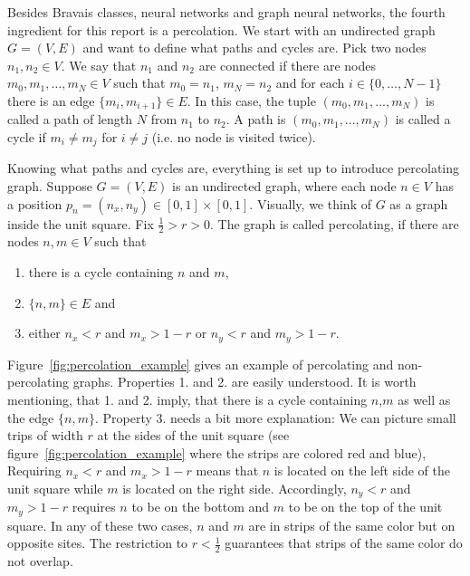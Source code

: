 Besides Bravais classes, neural networks and graph neural networks, the fourth ingredient for this report is a percolation.
We start with an undirected graph $G=(V,E)$ and want to define what paths and cycles are. Pick two nodes $n_1, n_2\in V$. We say that $n_1$ and $n_2$ are connected if
there are nodes $m_0,m_1,\dots,m_N\in V$ such that $m_0=n_1$, $m_N=n_2$ and for each $i\in\{0,\dots,N-1\}$ there is an edge $\{m_i,m_{i+1}\}\in E$.
In this case, the tuple $(m_0,m_1,...,m_N)$ is called a path of length $N$ from $n_1$ to $n_2$. A path is $(m_0,m_1,...,m_N)$ is called a cycle if $m_i\neq m_j$ for $i\neq j$ (i.e. no node is visited twice).

Knowing what paths and cycles are, everything is set up to introduce percolating graph. Suppose $G=(V,E)$ is an undirected graph, 
where each node $n\in V$ has a position $p_n=(n_x,n_y)\in[0,1]\times[0,1]$. Visually, we think of $G$ as a graph inside the unit square.
Fix $\frac{1}{2}>r>0$. The graph is called percolating, if there are nodes $n,m\in V$ such that
\begin{enumerate}
    \item there is a cycle containing $n$ and $m$,
    \item $\{n,m\}\in E$ and
    \item either $n_x<r$ and $m_x>1-r$ or $n_y<r$ and $m_y>1-r$.
\end{enumerate}
Figure~\ref{fig:percolation_example} gives an example of percolating and non-percolating graphs. 
Properties 1. and 2. are easily understood. It is worth mentioning, that 1. and 2. imply, that there is a cycle containing $n$,$m$ as well as the edge $\{n,m\}$.
Property 3. needs a bit more explanation: We can picture small trips of width $r$ at the sides of the unit square 
(see figure~\ref{fig:percolation_example} where the strips are colored red and blue), Requiring $n_x<r$ and $m_x>1-r$ means that $n$ is located on the left side of the unit square while
$m$ is located on the right side. 
Accordingly, $n_y<r$ and $m_y>1-r$ requires $n$ to be on the bottom and $m$ to be on the top of the unit square.
In any of these two cases, $n$ and $m$ are in strips of the same color but on opposite sites.
The restriction to $r<\frac{1}{2}$ guarantees that strips of the same color do not overlap.

